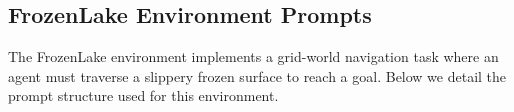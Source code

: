 



\subsection{FrozenLake Environment Prompts}

The FrozenLake environment implements a grid-world navigation task where an agent must traverse a slippery frozen surface to reach a goal. Below we detail the prompt structure used for this environment.

